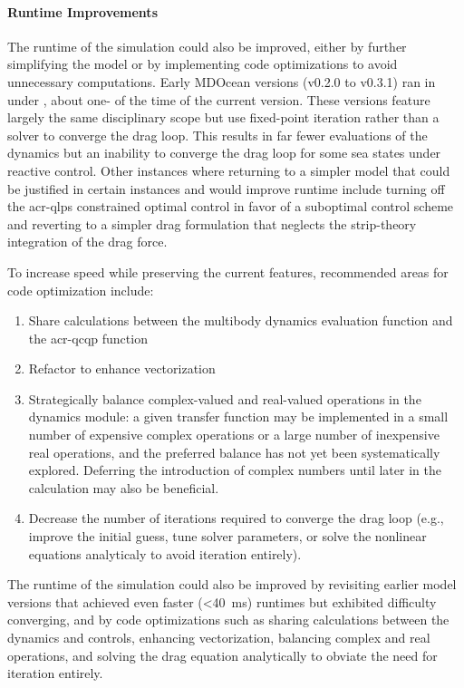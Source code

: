     \paragraph{Runtime Improvements}
    The runtime of the simulation could also be improved, either by further simplifying the model
    or by implementing code optimizations to avoid unnecessary computations.
    Early MDOcean versions (v0.2.0 to v0.3.1) ran in under \resultsAOR[simRuntimeOld],
    about one-%
    \makeatletter%
    \phantom{\rlap{%
    \resultsAOR[multiplierOldRuntime] %
    \global\let\SavedMultiplier\resultsAOR@out %
    }}%
    \makeatother%
    \ordinalstringnum{\SavedMultiplier}
    of the time of the current version.
    These versions feature largely the same disciplinary scope but use fixed-point iteration rather than a solver to converge the drag loop.
    This results in far fewer evaluations of the dynamics but an inability to converge the drag loop for some sea states under reactive control.
    Other instances where returning to a simpler model that could be justified in certain instances and would improve runtime include
    turning off the \gls{acr-qlps} constrained optimal control in favor of a suboptimal control scheme
    and reverting to a simpler drag formulation that neglects the strip-theory integration of the drag force.
    
    To increase speed while preserving the current features, recommended areas for code optimization include:
    \begin{enumerate}
        \item Share calculations between the multibody dynamics evaluation function and the \gls{acr-qcqp} function
        \item Refactor to enhance vectorization
        \item Strategically balance complex-valued and real-valued operations in the dynamics module: a given transfer function may be implemented in a small number of expensive complex operations or a large number of inexpensive real operations, and the preferred balance has not yet been systematically explored. Deferring the introduction of complex numbers until later in the calculation may also be beneficial.
        \item Decrease the number of iterations required to converge the drag loop (e.g., improve the initial guess, tune solver parameters, or solve the nonlinear equations analyticaly to avoid iteration entirely).
    \end{enumerate}
\else
    The runtime of the simulation could also be improved by revisiting earlier model versions that achieved
    even faster (<40~ms) runtimes but exhibited difficulty converging,
    and by code optimizations such as sharing calculations between the dynamics and controls,
    enhancing vectorization, balancing complex and real operations,
    and solving the drag equation analytically to obviate the need for iteration entirely.
\fi